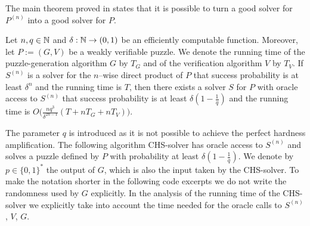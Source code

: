 The main theorem proved in \cite{canetti2005hardness} states that it is possible to turn a good solver for $P^{(n)}$
into a good solver for $P$.
%
\begin{theorem}
  \label{thm:wvp_chs}
Let $n,q \in \mathbb{N}$ and $\delta: \mathbb{N} \rightarrow (0,1)$ be an efficiently computable function.
Moreover, let $P := (G,V)$ be a weakly verifiable puzzle. We denote the running time of the
puzzle-generation algorithm $G$ by $T_G$ and of the verification algorithm $V$ by $T_V$.
If $S^{(n)}$ is a solver for the $n$--wise direct product of $P$ that success probability is at least $\delta^{n}$
and the running time is $T$, then there exists a solver $S$ for $P$ with oracle access to $S^{(n)}$ that success
probability is at least $\delta(1-\frac{1}{q})$ and the running time is $O\Big(\frac{nq^3}{\delta^{2n-1}}(T + nT_G + nT_V)\Big)$.
\end{theorem}
%
The parameter $q$ is introduced as it is not possible to achieve the perfect hardness amplification.
The following algorithm CHS-solver has oracle access to $S^{(n)}$ and
solves a puzzle defined by $P$ with probability at least $\delta(1  - \frac{1}{q})$.
We denote by $p \in \{0,1\}^{*}$ the output of $G$, which is also the input taken by the CHS-solver.
To make the notation shorter in the following code excerpts we do not write the randomness used by $G$ explicitly.
In the analysis of the running time of the CHS-solver we explicitly take into account the time needed for the oracle calls to $S^{(n)}$, $V$, $G$.

